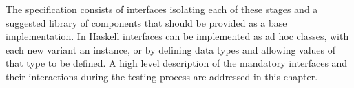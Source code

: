 
The specification consists of interfaces isolating each of these stages
and a suggested library of components that should be provided as a base implementation.
In Haskell interfaces can be implemented as ad hoc classes,
with each new variant an instance, 
or by defining data types and allowing values of that type to be defined.
A high level description of the mandatory interfaces and 
their interactions during the testing process are addressed in this chapter.


